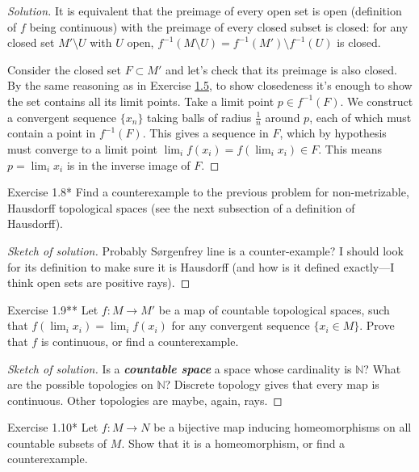\begin{proof}[Solution]\leavevmode
It is equivalent that the preimage of every open set is open (definition of $f$ being continuous) with the preimage of every closed subset is closed: for any closed set $M'\setminus U$ with $U$ open, $f^{-1}(M\setminus U)=f^{-1}(M')\setminus f^{-1}(U)$ is closed.

Consider the closed set $F\subset M'$ and let's check that its preimage is also closed. By the same reasoning as in Exercise \hyperref[exer:1.5]{1.5}, to show closedeness it's enough to show the set contains all its limit points. Take a limit point $p\in f^{-1}(F)$. We construct a convergent sequence $\{x_n\}$ taking balls of radius $\frac{1}{n}$ around $p$, each of which must contain a point in $f^{-1}(F)$. This gives a sequence in $F$, which by hypothesis must converge to a limit point $\lim_{i} f(x_i)=f\left(\lim_i x_i\right) \in F$. This means $p=\lim_{i} x_i$ is in the inverse image of $F$.
\end{proof}

\begin{thing4}{Exercise 1.8*}\leavevmode
	Find a counterexample to the previous problem for non-metrizable, Hausdorff topological spaces (see the next subsection of a definition of Hausdorff).
\end{thing4}

\begin{proof}[Sketch of solution]\leavevmode
Probably Sørgenfrey line is a counter-example? I should look for its definition to make sure it is Hausdorff (and how is it defined exactly---I think open sets are positive rays).
\end{proof}

\begin{thing4}{Exercise 1.9**}\leavevmode
	Let $f: M\longrightarrow M'$ be a map of countable topological spaces, such that $f(\lim_{i} x_i)=\lim_{i} f(x_i)$ for any convergent sequence $\{ x_i \in M\}$. Prove that $f$ is continuous, or find a counterexample.
\end{thing4}

\begin{proof}[Sketch of solution]\leavevmode
	Is a \textit{\textbf{countable space}} a space whose cardinality is $\mathbb{N}$? What are the possible topologies on $\mathbb{N}$? Discrete topology gives that every map is continuous. Other topologies are maybe, again, rays.
\end{proof}

\begin{thing4}{Exercise 1.10*}\leavevmode
	Let $f:M\longrightarrow N$ be a bijective map inducing homeomorphisms on all countable subsets of $M$. Show that it is a homeomorphism, or find a counterexample.
\end{thing4}

